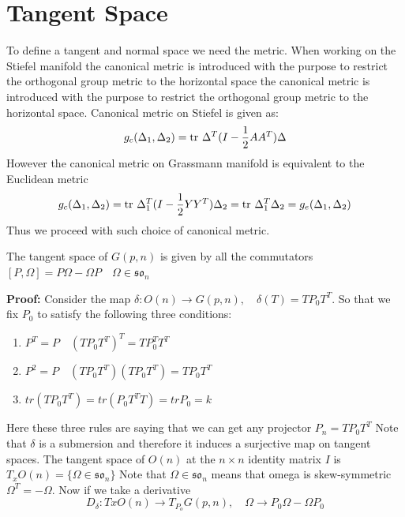 \documentclass[11pt,a4paper]{report}
\begin{document}
\section{Tangent Space}
To define a tangent and normal space we need the metric. 
When working on the Stiefel manifold the canonical metric is introduced with the purpose to restrict the orthogonal group metric to the horizontal space the canonical metric is introduced with the purpose to restrict the orthogonal group metric to the horizontal space.
Canonical metric on Stiefel is given as:
$$ g_c(\Delta_1, \Delta_2) = \textrm{tr } \Delta ^T (I - \frac{1}{2} A A^T) \Delta 
$$
However the canonical metric on Grassmann manifold is equivalent to the Euclidean metric
$$
g_c(\Delta_1, \Delta_2) = \textrm{tr } \Delta_1^T (I - \frac{1}{2} Y Y^T) \Delta_2 = \textrm{tr } \Delta_1^T \Delta_2 = g_e(\Delta_1,\Delta_2) 
$$
Thus we proceed with such choice of canonical metric.
\begin{Prop}
   The tangent space of $G(p,n)$ is given by all the commutators $ [ P, \Omega] = P \Omega - \Omega P \quad \Omega \in \mathfrak{so}_n  $ 
\end{Prop}
\textbf{Proof:}
Consider the map $\delta: O(n) \to G(p,n), \quad \delta(T) = T P_0 T^T$. So that we fix $P_0$ to satisfy the following three conditions:
\begin{enumerate}
    \item $P^T = P \quad (T P_0 T^T)^T = T P_0^T T^T$
    \item $P^2 = P \quad (T P_0 T^T) (T P_0 T^T) = T P_0 T^T$
    \item $tr(T P_0 T^T) = tr (P_0 T^T T) = tr P_0 = k$
\end{enumerate}
Here these three rules are saying that we can get any projector $P_n = T P_0 T^T$
Note that $\delta$ is a submersion and therefore it induces a surjective map on tangent spaces.
The tangent space of $O(n)$ at the $n \times n$ identity matrix $I$ is
$ T_x O(n) = \{ \Omega \in \mathfrak{so}_n \} $ Note that $\Omega \in \mathfrak{so}_n$ means that omega is skew-symmetric $\Omega^T = -\Omega$.
Now if we take a derivative
$$ D_{\delta} : Tx O(n) \to T_{P_o} G(p,n), \quad \Omega \to P_0 \Omega - \Omega P_0 $$
\end{document}
